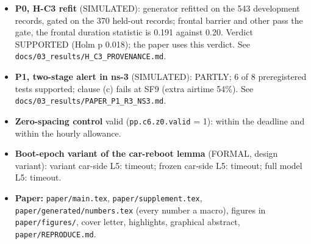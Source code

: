 \begin{itemize}
\item \textbf{P0, H-C3 refit} (SIMULATED): generator refitted on the 543 development records, gated on the 370 held-out records; frontal barrier and other pass the gate, the frontal duration statistic is 0.191 against 0.20. Verdict SUPPORTED (Holm p 0.018); the paper uses this verdict. See \texttt{docs/03\_results/H\_C3\_PROVENANCE.md}.
\item \textbf{P1, two-stage alert in ns-3} (SIMULATED): PARTLY; 6 of 8 preregistered tests supported; clause (c) fails at SF9 (extra airtime 54\%). See \texttt{docs/03\_results/PAPER\_P1\_R3\_NS3.md}.
\item \textbf{Zero-spacing control} valid (\texttt{pp.c6.z0.valid} = 1): within the deadline and within the hourly allowance.
\item \textbf{Boot-epoch variant of the car-reboot lemma} (FORMAL, design variant): variant car-side L5: timeout; frozen car-side L5: timeout; full model L5: timeout.
\item \textbf{Paper:} \texttt{paper/main.tex}, \texttt{paper/supplement.tex}, \texttt{paper/generated/numbers.tex} (every number a macro), figures in \texttt{paper/figures/}, cover letter, highlights, graphical abstract, \texttt{paper/REPRODUCE.md}.
\end{itemize}



